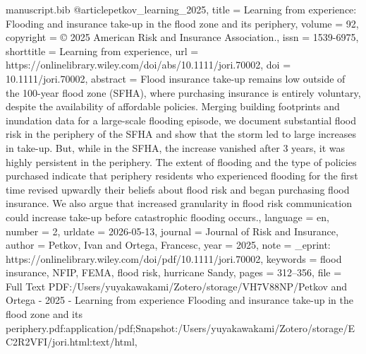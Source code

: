 \begin{filecontents*}[force]{manuscript.bib}
@article{petkov_learning_2025,
	title = {Learning from experience: {Flooding} and insurance take-up in the flood zone and its periphery},
	volume = {92},
	copyright = {© 2025 American Risk and Insurance Association.},
	issn = {1539-6975},
	shorttitle = {Learning from experience},
	url = {https://onlinelibrary.wiley.com/doi/abs/10.1111/jori.70002},
	doi = {10.1111/jori.70002},
	abstract = {Flood insurance take-up remains low outside of the 100-year flood zone (SFHA), where purchasing insurance is entirely voluntary, despite the availability of affordable policies. Merging building footprints and inundation data for a large-scale flooding episode, we document substantial flood risk in the periphery of the SFHA and show that the storm led to large increases in take-up. But, while in the SFHA, the increase vanished after 3 years, it was highly persistent in the periphery. The extent of flooding and the type of policies purchased indicate that periphery residents who experienced flooding for the first time revised upwardly their beliefs about flood risk and began purchasing flood insurance. We also argue that increased granularity in flood risk communication could increase take-up before catastrophic flooding occurs.},
	language = {en},
	number = {2},
	urldate = {2026-05-13},
	journal = {Journal of Risk and Insurance},
	author = {Petkov, Ivan and Ortega, Francesc},
	year = {2025},
	note = {\_eprint: https://onlinelibrary.wiley.com/doi/pdf/10.1111/jori.70002},
	keywords = {flood insurance, NFIP, FEMA, flood risk, hurricane Sandy},
	pages = {312--356},
	file = {Full Text PDF:/Users/yuyakawakami/Zotero/storage/VH7V88NP/Petkov and Ortega - 2025 - Learning from experience Flooding and insurance take-up in the flood zone and its periphery.pdf:application/pdf;Snapshot:/Users/yuyakawakami/Zotero/storage/EC2R2VFI/jori.html:text/html},
}



\end{filecontents*}
